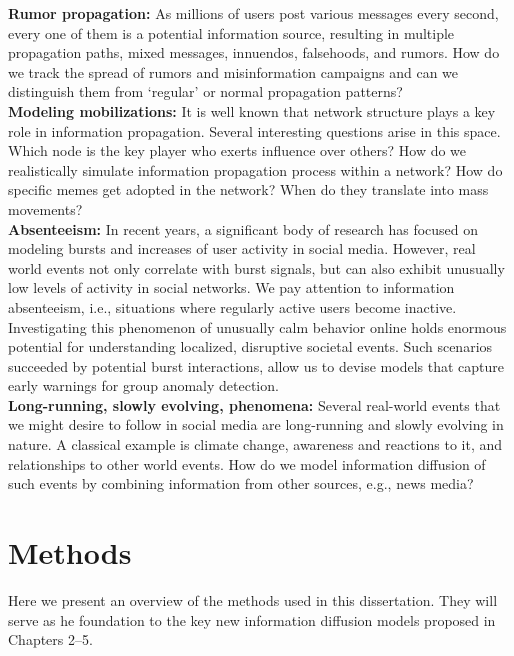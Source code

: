 \noindent
{\bf Rumor propagation:} As millions of users post various messages every second, every one of them
is a potential information source, resulting in 
multiple propagation paths, mixed messages, innuendos, falsehoods, and rumors.
How do we track the spread of rumors and misinformation campaigns and can we distinguish them
from `regular' or normal propagation patterns?\\

\noindent
{\bf Modeling mobilizations:}
It is well known that network structure plays a key role in information propagation. 
Several
interesting questions arise in this space.
Which node is the key player who exerts influence over others? How do we realistically simulate
information propagation process within a network? 
How do specific
memes get adopted in the network? When do they translate into mass movements?\\

\noindent
{\bf Absenteeism:}
In recent years, a significant body of research has focused on modeling bursts and increases of user activity in social media. However, real world events not only correlate with burst signals, but can also exhibit unusually low levels of activity in social networks. We pay attention to 
information absenteeism, i.e.,
situations where regularly active users become inactive. Investigating this phenomenon of 
unusually calm behavior online holds enormous potential for understanding localized, 
disruptive societal events.  Such scenarios succeeded by potential burst interactions, allow us to devise models that capture early warnings for group anomaly detection.\\

\noindent
{\bf Long-running, slowly evolving, phenomena:} Several real-world
events that we might desire to follow in social media are long-running and slowly evolving
in nature. A classical example is climate change, awareness and reactions to it, and relationships
to other world events. How do we model information diffusion of such events by combining information
from other sources, e.g., news media?

\section{Methods}
Here we present an overview of the methods used in this dissertation.
They will serve as he foundation to the
key new information diffusion models proposed  in Chapters 2--5.

